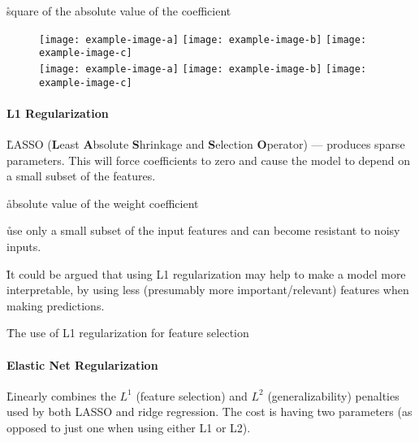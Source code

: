 \r{square of the absolute value of the coefficient}

\begin{figure}[htp]
	\centering
	\texttt{[image: example-image-a]}\hfil
	\texttt{[image: example-image-b]}\hfil
	\texttt{[image: example-image-c]}\hfil\\
	\medskip
	\texttt{[image: example-image-a]}\hfil
	\texttt{[image: example-image-b]}\hfil
	\texttt{[image: example-image-c]}\hfil
	\caption{}
	\label{fig:basics_regularization_l2_example}
\end{figure}



\paragraph{L1 Regularization}


\r{LASSO (\textbf{L}east \textbf{A}bsolute \textbf{S}hrinkage and \textbf{S}election \textbf{O}perator) --- produces sparse parameters. This will force coefficients to zero and cause the model to depend on a small subset of the features.}

\r{absolute value of the weight coefficient}

\r{use only a small subset of the input features and can become resistant to noisy inputs.}

\r{It could be argued that using L1 regularization may help to make a model more interpretable, by using less (presumably more important/relevant) features when making predictions.}

\r{The use of L1 regularization for feature selection}


\paragraph{Elastic Net Regularization}

\r{Linearly combines the $L^1$ (feature selection) and $L^2$ (generalizability) penalties used by both LASSO and ridge regression. The cost is having two parameters (as opposed to just one when using either L1 or L2).}

